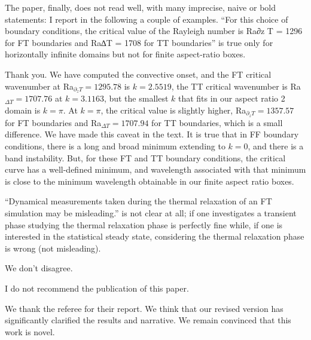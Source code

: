 \documentclass[aps, 11pt, singlecolumn]{revtex4-1} %
\begin{document}
\begin{singlespace}
\begin{myquotation}
The paper, finally, does not read well, with many imprecise, naive or bold statements: I report in the following a couple of examples. 
``For this choice of boundary conditions, the critical value of the Rayleigh number is Ra∂z T = 1296 for FT boundaries and Ra∆T = 1708 for TT boundaries'' is true only for horizontally infinite domains but not for finite aspect-ratio boxes.
\end{myquotation}
Thank you.
We have computed the convective onset, and the FT critical wavenumber at Ra$_{\partial_z T} = 1295.78$ is $k = 2.5519$, the TT critical wavenumber is Ra$_{\Delta T} = 1707.76$ at $k = 3.1163$, but the smallest $k$ that fits in our aspect ratio 2 domain is $k = \pi$.
At $k = \pi$, the critical value is slightly higher, Ra$_{\partial_z T} = 1357.57$ for FT boundaries and Ra$_{\Delta T} = 1707.94$ for TT boundaries, which is a small difference.
We have made this caveat in the text.
It is true that in FF boundary conditions, there is a long and broad minimum extending to $k = 0$, and there is a band instability.
But, for these FT and TT boundary conditions, the critical curve has a well-defined minimum, and wavelength associated with that minimum is close to the minimum wavelength obtainable in our finite aspect ratio boxes.

\begin{myquotation}
``Dynamical measurements taken during the thermal relaxation of an FT simulation may be misleading.'' is not clear at all; if one investigates a transient phase studying the thermal relaxation phase is perfectly fine while, if one is interested in the statistical steady state, considering the thermal relaxation phase is wrong (not misleading). 
\end{myquotation}
We don't disagree.

\begin{myquotation}
I do not recommend the publication of this paper.
\end{myquotation}
We thank the referee for their report.
We think that our revised version has significantly clarified the results and narrative.
We remain convinced that this work is novel.


\end{singlespace}





\end{document}
